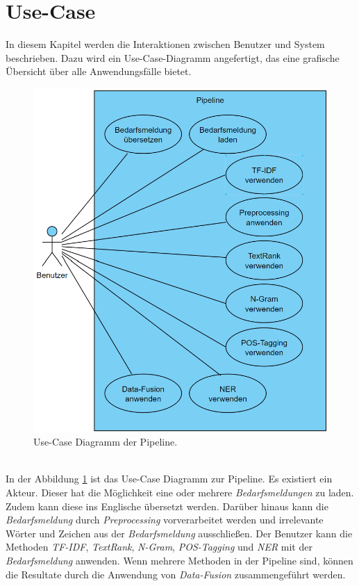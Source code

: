 \section{Use-Case}
\label{sec:usecase}
In diesem Kapitel werden die Interaktionen zwischen Benutzer und System beschrieben. Dazu wird ein Use-Case-Diagramm angefertigt, das eine grafische Übersicht über alle Anwendungsfälle bietet.
\begin{figure}[H]
	\centering  
	\includegraphics[width=\linewidth]{Abbildungen/use-case.png}
	\caption{Use-Case Diagramm der Pipeline.}
	\label{fig:usecasediagrammwirklich}
\end{figure}\mbox{} \\
In der Abbildung \ref{fig:usecasediagrammwirklich} ist das Use-Case Diagramm zur Pipeline. Es existiert ein Akteur. Dieser hat die Möglichkeit eine oder mehrere \emph{Bedarfsmeldungen} zu laden. Zudem kann diese ins Englische übersetzt werden. Darüber hinaus kann die \emph{Bedarfsmeldung} durch \emph{Preprocessing} vorverarbeitet werden und irrelevante Wörter und Zeichen aus der \emph{Bedarfsmeldung} ausschließen. Der Benutzer kann die Methoden \emph{TF-IDF}, \emph{TextRank}, \emph{N-Gram}, \emph{POS-Tagging} und \emph{NER} mit der \emph{Bedarfsmeldung} anwenden. Wenn mehrere Methoden in der Pipeline sind, können die Resultate durch die Anwendung von \emph{Data-Fusion} zusammengeführt werden.
